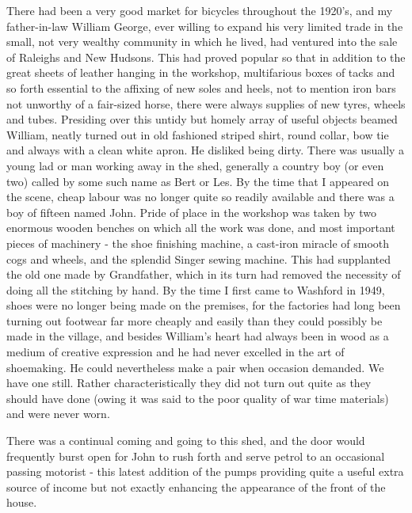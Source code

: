 There had been a very good market for bicycles throughout the 1920's, and my father-in-law William George, ever willing to expand his very limited trade in the small, not very wealthy community in which he lived, had ventured into the sale of Raleighs and New Hudsons. This had proved popular so that in addition to the great sheets of leather hanging in the workshop, multifarious boxes of tacks and so forth essential to the affixing of new soles and heels, not to mention iron bars not unworthy of a fair-sized horse, there were always supplies of new tyres, wheels and tubes. Presiding over this untidy but homely array of useful objects beamed William, neatly turned out in old fashioned striped shirt, round collar, bow tie and always with a clean white apron. He disliked being dirty. There was usually a young lad or man working away in the shed, generally a country boy (or even two) called by some such name as Bert or Les. By the time that I appeared on the scene, cheap labour was no longer quite so readily available and there was a boy of fifteen named John. Pride of place in the workshop was taken by two enormous wooden benches on which all the work was done, and most important pieces of machinery - the shoe finishing machine, a cast-iron miracle of smooth cogs and wheels, and the splendid Singer sewing machine. This had supplanted the old one made by Grandfather, which in its turn had removed the necessity of doing all the stitching by hand. By the time I first came to Washford in 1949, shoes were no longer being made on the premises, for the factories had long been turning out footwear far more cheaply and easily than they could possibly be made in the village, and besides William's heart had always been in wood as a medium of creative expression and he had never excelled in the art of shoemaking. He could nevertheless make a pair when occasion demanded. We have one still. Rather characteristically they did not turn out quite as they should have done (owing it was said to the poor quality of war time materials) and were never worn.

There was a continual coming and going to this shed, and the door would frequently burst open for John to rush forth and serve petrol to an occasional passing motorist - this latest addition of the pumps providing quite a useful extra source of income but not exactly enhancing the appearance of the front of the house.

